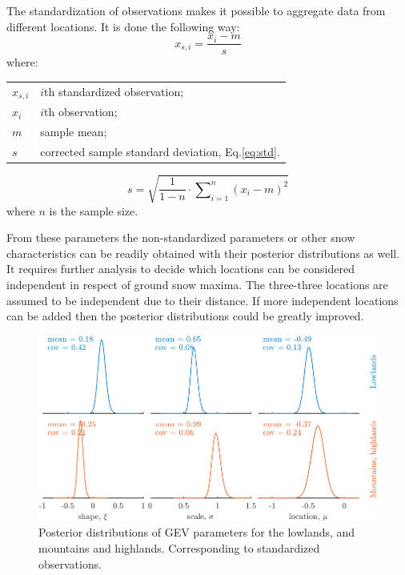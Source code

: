 The standardization of observations makes it possible to aggregate data from different locations. It is done the following way:
\begin{equation}
\label{eq:stand_obs}
 	{x_{s,i}} = \frac{{{x_i} - m}}{s}
\end{equation}
where:

\begin{tabular}{ll}
	$x_{s,i}$ & $i$th standardized observation; \\
	$x_i$ & $i$th observation; \\
	$m$ & sample mean; \\
	$s$ & corrected sample standard deviation, Eq.\ref{eq:std}.
\end{tabular} \medskip

\begin{equation}
\label{eq:std}
 	s = \sqrt {\frac{1}{{1 - n}} \cdot \sum\nolimits_{i = 1}^n {{{\left( {{x_i} - m} \right)}^2}} } 
\end{equation}
where $n$ is the sample size.

From these parameters the non-standardized parameters or other snow characteristics can be readily obtained with their posterior distributions as well. It requires further analysis to decide which locations can be considered independent in respect of ground snow maxima. The three-three locations are assumed to be independent due to their distance. If more independent locations can be added then the posterior distributions could be greatly improved.

\begin{figure}[htbp!]
	\centering    
	\includegraphics[width=1\textwidth]{GEV_posterior.pdf}
	\caption{Posterior distributions of GEV parameters for the lowlands, and mountains and highlands. Corresponding to standardized observations.}
	\label{fig:GEV_posterior}
\end{figure}

